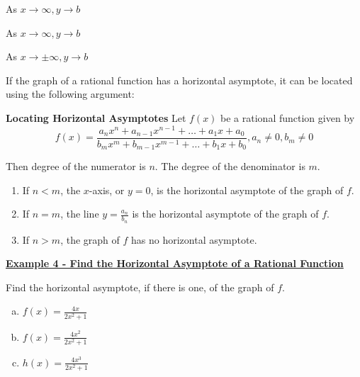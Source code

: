 \documentclass[12pt]{book}
\newcommand{\D}{\displaystyle}
\begin{document}
\begin{boxR}
\begin{multicols}{3}
    As $x \to \infty, y \to b$
    
    As $x \to \infty, y \to b$

    As $x \to \pm \infty, y \to b$ 
    
\end{multicols}
\end{boxR}
\newpage

\newpage

If the graph of a rational function has a horizontal asymptote, it can be located 
using the following argument:

\begin{boxR}
    \textbf{Locating Horizontal Asymptotes}
    \vspace{1mm}
    \hline
    \vspace{2mm}
    Let $f(x)$ be a rational function given by $$f(x) = \frac{a_nx^n + a_{n-1}x^{n-1}+ \ldots + a_1x +a_0}{b_mx^m+b_{m-1}x^{m-1}+ \ldots +b_1x +b_0}, a_n \neq 0, b_m \neq 0$$

    Then degree of the numerator is $n$. The degree of the denominator is $m$. 
    \begin{enumerate}
        \item If $n < m$, the $x$-axis, or $y=0$, is the horizontal asymptote of the graph of $f$.
        \item If $n = m$, the line $\D y=\frac{a_n}{b_n}$ is the horizontal asymptote of the graph of $f$.
        \vspace{1mm}
        
        \item If $n > m$, the graph of $f$ has no horizontal asymptote.
    \end{enumerate}
\end{boxR}
\vspace{3mm}



\underline{\textbf{Example 4 - Find the Horizontal Asymptote of a Rational Function}}

Find the horizontal asymptote, if there is one, of the graph of $f$.
\begin{enumerate}[(a)]
    \item $\D f(x)=\frac{4x}{2x^2+1}$
    \vspace{30mm}
    \item $\D f(x)=\frac{4x^2}{2x^2+1}$
    \vspace{30mm}
    \item $\D h(x)=\frac{4x^3}{2x^2+1}$
\end{enumerate}
\end{document}

